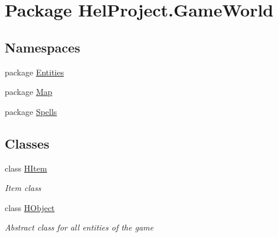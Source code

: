 \hypertarget{namespace_hel_project_1_1_game_world}{}\section{Package Hel\+Project.\+Game\+World}
\label{namespace_hel_project_1_1_game_world}
\subsection*{Namespaces}
\begin{DoxyCompactItemize}
\item 
package \hyperlink{namespace_hel_project_1_1_game_world_1_1_entities}{Entities}
\item 
package \hyperlink{namespace_hel_project_1_1_game_world_1_1_map}{Map}
\item 
package \hyperlink{namespace_hel_project_1_1_game_world_1_1_spells}{Spells}
\end{DoxyCompactItemize}
\subsection*{Classes}
\begin{DoxyCompactItemize}
\item 
class \hyperlink{class_hel_project_1_1_game_world_1_1_h_item}{H\+Item}
\begin{DoxyCompactList}\small\item\em Item class \end{DoxyCompactList}\item 
class \hyperlink{class_hel_project_1_1_game_world_1_1_h_object}{H\+Object}
\begin{DoxyCompactList}\small\item\em Abstract class for all entities of the game \end{DoxyCompactList}\end{DoxyCompactItemize}
